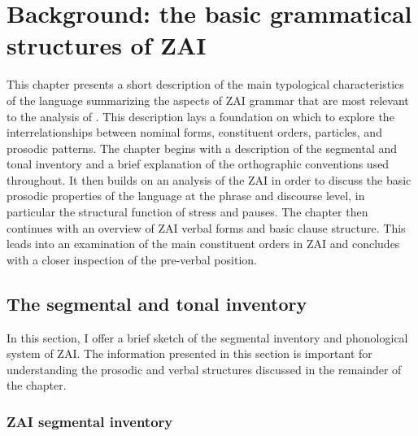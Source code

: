 \chapter{Background: the basic grammatical structures of ZAI}\label{backgroundchapter}


This chapter presents a short description of the main typological characteristics of the language summarizing the aspects of ZAI grammar that are most relevant to the analysis of . This description lays a foundation on which to explore the interrelationships between nominal forms, constituent orders, particles, and prosodic patterns. The chapter begins with a description of the segmental and tonal inventory and a brief explanation of the orthographic conventions used throughout. It then builds on an analysis of the ZAI  in order to discuss the basic prosodic properties of the language at the phrase and discourse level, in particular the structural function of stress and pauses. The chapter then continues with an overview of ZAI verbal forms and basic clause structure. This leads into an examination of the main constituent orders in ZAI and concludes with a closer inspection of the pre-verbal position. 



\section{The segmental and tonal inventory}\label{briefsketch}


In this section, I offer a brief sketch of the segmental inventory and phonological system of ZAI. The information presented in this section is important for understanding the prosodic and verbal structures discussed in the remainder of the chapter.

 
\subsection{ZAI segmental inventory}

